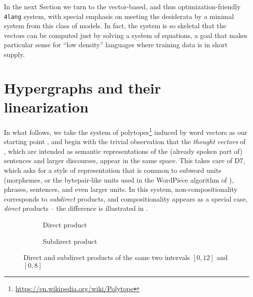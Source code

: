 \documentclass[output=paper]{langscibook}
\begin{document}
In the next Section we turn to the vector-based, and thus
optimization-friendly \texttt{4lang} system, with special emphasis on meeting
the desiderata by a minimal system from this class of models. In fact, the
system is so skeletal that the vectors can be computed just by solving a
system of equations, a goal that makes particular sense for ``low density''
languages where training data is in short supply.

\section{Hypergraphs and their linearization}\label{4lang}\largerpage

In what follows, we take the system of
polytopes\footnote{\url{https://en.wikipedia.org/wiki/Polytope}} induced by word
vectors as our starting point \citep{Kornai:2022}, and begin with the trivial
observation that the \textit{thought vectors} of \citet{LeCun:2015}, which are
intended as semantic representations of the (already spoken part of) sentences
and larger discourses, appear in the same space. This takes care of D7, which
asks for a style of representation that is common to subword units (morphemes,
or the bytepair-like units used in the WordPiece algorithm of \cite{Wu:2016}),
phrases, sentences, and even larger units. In this system,
non-compositionality corresponds to \textit{subdirect} products, and
compositionality appears as a special case, \textit{direct} products
\citep{Kornai:2010} -- the difference is illustrated in
.


\begin{figure}[h]
    \begin{subfigure}[t]{0.5\textwidth}
	\centering
        \caption{Direct product}
    \end{subfigure}%
    \begin{subfigure}[t]{0.5\textwidth}
        \centering
                \caption{Subdirect product}
    \end{subfigure}
    \caption{Direct and subdirect products of the same two intervals $[0,12]$ and $[0,8]$}\label{fig:dirsubdir}
\end{figure}
\end{document}
